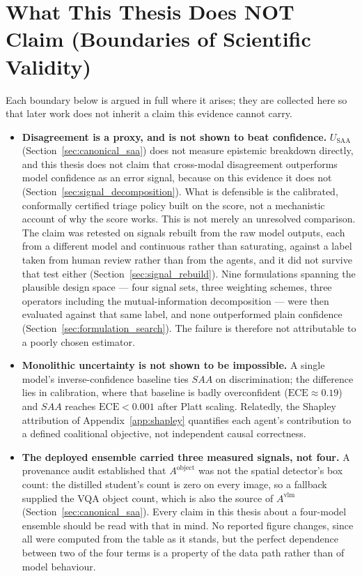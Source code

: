 \documentclass[12pt,a4paper]{report}
\begin{document}
\section{What This Thesis Does NOT Claim (Boundaries of Scientific Validity)}
\label{sec:not_claim}
Each boundary below is argued in full where it arises; they are collected here so that later work does not inherit a claim this evidence cannot carry.
\begin{itemize}
    \item \textbf{Disagreement is a proxy, and is not shown to beat confidence.} $U_{\text{SAA}}$ (Section~\ref{sec:canonical_saa}) does not measure epistemic breakdown directly, and this thesis does not claim that cross-modal disagreement outperforms model confidence as an error signal, because on this evidence it does not (Section~\ref{sec:signal_decomposition}). What is defensible is the calibrated, conformally certified triage policy built on the score, not a mechanistic account of why the score works. This is not merely an unresolved comparison. The claim was retested on signals rebuilt from the raw model outputs, each from a different model and continuous rather than saturating, against a label taken from human review rather than from the agents, and it did not survive that test either (Section~\ref{sec:signal_rebuild}). Nine formulations spanning the plausible design space --- four signal sets, three weighting schemes, three operators including the mutual-information decomposition --- were then evaluated against that same label, and none outperformed plain confidence (Section~\ref{sec:formulation_search}). The failure is therefore not attributable to a poorly chosen estimator.
    \item \textbf{Monolithic uncertainty is not shown to be impossible.} A single model's inverse-confidence baseline ties $SAA$ on discrimination; the difference lies in calibration, where that baseline is badly overconfident ($\text{ECE}\approx0.19$) and $SAA$ reaches $\text{ECE}<0.001$ after Platt scaling. Relatedly, the Shapley attribution of Appendix~\ref{app:shapley} quantifies each agent's contribution to a defined coalitional objective, not independent causal correctness.
    \item \textbf{The deployed ensemble carried three measured signals, not four.} A provenance audit established that $A^{\text{object}}$ was not the spatial detector's box count: the distilled student's count is zero on every image, so a fallback supplied the VQA object count, which is also the source of $A^{\text{vlm}}$ (Section~\ref{sec:canonical_saa}). Every claim in this thesis about a four-model ensemble should be read with that in mind. No reported figure changes, since all were computed from the table as it stands, but the perfect dependence between two of the four terms is a property of the data path rather than of model behaviour.

\end{itemize}
\end{document}
